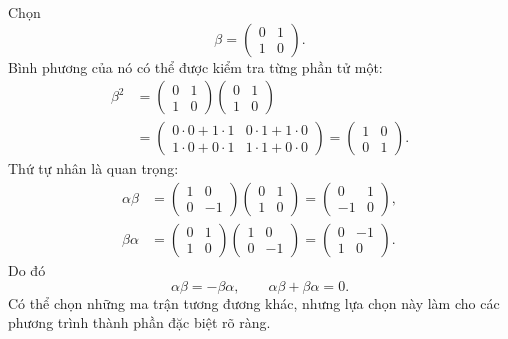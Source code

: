 Chọn
\begin{equation}
\beta=
\begin{pmatrix}
0&1\\
1&0
\end{pmatrix}.
\end{equation}
Bình phương của nó có thể được kiểm tra từng phần tử một:
\begin{equation}
\begin{aligned}
\beta^2
&=
\begin{pmatrix}
0&1\\
1&0
\end{pmatrix}
\begin{pmatrix}
0&1\\
1&0
\end{pmatrix}\\
&=
\begin{pmatrix}
0\cdot0+1\cdot1&0\cdot1+1\cdot0\\
1\cdot0+0\cdot1&1\cdot1+0\cdot0
\end{pmatrix}
=
\begin{pmatrix}
1&0\\
0&1
\end{pmatrix}.
\end{aligned}
\end{equation}
Thứ tự nhân là quan trọng:
\begin{align}
\alpha\beta
&=
\begin{pmatrix}
1&0\\
0&-1
\end{pmatrix}
\begin{pmatrix}
0&1\\
1&0
\end{pmatrix}
=
\begin{pmatrix}
0&1\\
-1&0
\end{pmatrix},\\
\beta\alpha
&=
\begin{pmatrix}
0&1\\
1&0
\end{pmatrix}
\begin{pmatrix}
1&0\\
0&-1
\end{pmatrix}
=
\begin{pmatrix}
0&-1\\
1&0
\end{pmatrix}.
\end{align}
Do đó
\begin{equation}
\alpha\beta=-\beta\alpha,
\qquad
\alpha\beta+\beta\alpha=0.
\end{equation}
Có thể chọn những ma trận tương đương khác, nhưng lựa chọn này làm cho các phương trình thành phần đặc biệt rõ ràng.

